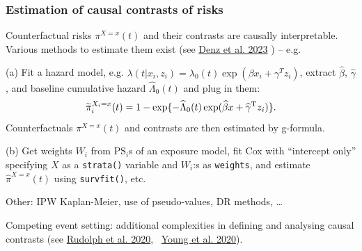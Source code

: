 \documentclass[12pt,dvipsnames,t,aspectratio=169, handout%
]{beamer}
\begin{document}
\begin{frame}
\frametitle{\large Estimation of causal contrasts of risks} 
\bi
\item
 Counterfactual %
risks $\pi^{X=x}(t)$ and their contrasts are causally interpretable.  
Various methods to estimate them exist
({\small see \href{https://doi.org/10.1002/sim.9681}{\color{blue}Denz et al. 2023} })
\pause
 -- e.g.
\medskip
\item[(a)] 
Fit a hazard model, e.g. $\lambda(t|x_i, z_i) = \lambda_0(t)\exp(\beta x_i + \gamma^{T}z_i)$,
extract $\widehat\beta$, $\widehat\gamma$, and baseline cumulative hazard $\widehat\Lambda_0(t)$
and plug in them:
$$ %
 \widetilde{\pi}_i^{X_i=x}(t) = 1 - \exp \{ -\widehat\Lambda_0(t)\exp(\widehat\beta x + \widehat\gamma^{\small{\text{T}}} z_i) \}  .
$$ %
Counterfactuals $ {\pi}^{X=x}(t)$ and contrasts are then estimated by g-formula.
\pause
\medskip
\item[(b)]
Get weights $W_i$ from $\text{PS}_i$s of an exposure model, fit Cox with ``intercept only'' 
specifying $X$ as a {\color{blue}\texttt{strata()}} variable and 
$W_i$:s as {\color{blue}\texttt{weights}}, and estimate $\widehat{\pi}^{X=x}(t)$
using {\color{blue}\texttt{survfit()}}, etc.
\pause
\medskip
\item Other: IPW Kaplan-Meier, use of pseudo-values, DR methods, \dots
\medskip
\item Competing event setting: additional complexities in defining and analysing causal contrasts
({\small see \href{https://doi.org/10.1007/s40471-020-00240-7}{\color{blue}Rudolph et al. 2020}, \ 
\href{https://doi.org/10.1002/sim.8471}{\color{blue}Young et al. 2020}}).    
\ei
\end{frame}
\end{document}

